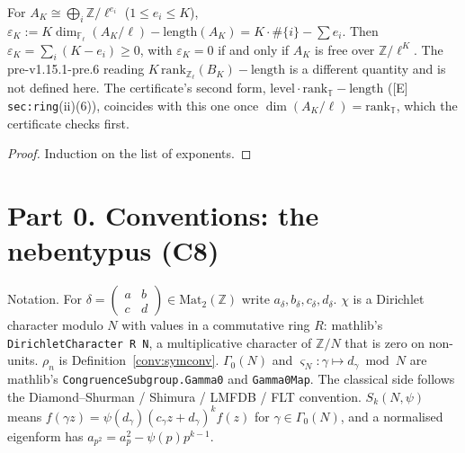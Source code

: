 \begin{definition}\label{conv:epsK}
  \leanok
  For $A_K\cong\bigoplus_i\mathbb Z/\ell^{e_i}$ ($1\le e_i\le K$), $\varepsilon_K:=K\dim_{\mathbb F_\ell}(A_K/\ell)-\mathrm{length}(A_K)=K\cdot\#\{i\}-\sum e_i$.
  Then $\varepsilon_K=\sum_i(K-e_i)\ge0$, with $\varepsilon_K=0$ if and only if $A_K$ is free over $\mathbb Z/\ell^K$. The
  pre-v1.15.1-pre.6 reading $K\,\mathrm{rank}_{\mathbb Z_\ell}(B_K)-\mathrm{length}$ is a different quantity and is not
  defined here. The certificate's second form, $\mathrm{level}\cdot\mathrm{rank}_{\mathbb T}-\mathrm{length}$ ([E]
  \texttt{sec:ring}(ii)(6)), coincides with this one once $\dim(A_K/\ell)=\mathrm{rank}_{\mathbb T}$, which the
  certificate checks first.
\end{definition}
\begin{proof}
  \leanok
  Induction on the list of exponents.
\end{proof}

\chapter{Part 0. Conventions: the nebentypus (C8)}\label{ch:nebentypus}

Notation. For $\delta=\left(\begin{smallmatrix}a&b\\c&d\end{smallmatrix}\right)\in\mathrm{Mat}_2(\mathbb Z)$ write
$a_\delta,b_\delta,c_\delta,d_\delta$. $\chi$ is a Dirichlet character modulo $N$ with values in a commutative ring
$R$: mathlib's \texttt{DirichletCharacter R N}, a multiplicative character of $\mathbb Z/N$ that is zero on
non-units. $\rho_n$ is Definition~\ref{conv:symconv}. $\Gamma_0(N)$ and $\varsigma_N\colon\gamma\mapsto d_\gamma\bmod N$
are mathlib's \texttt{CongruenceSubgroup.Gamma0} and \texttt{Gamma0Map}. The classical side follows the
Diamond--Shurman / Shimura / LMFDB / FLT convention. $S_k(N,\psi)$ means $f(\gamma z)=\psi(d_\gamma)(c_\gamma z+d_\gamma)^k f(z)$
for $\gamma\in\Gamma_0(N)$, and a normalised eigenform has $a_{p^2}=a_p^2-\psi(p)p^{k-1}$.

